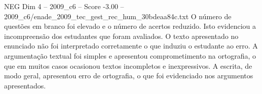 \begin{textsample}{NEG Dim 4 – 2009\_c6 – Score -3.00 – 2009\_c6/enade\_2009\_tec\_gest\_rec\_hum\_30bdeaa84c.txt}
O número de questões em branco foi elevado e o número de acertos reduzido.
Isto evidenciou a incompreensão dos estudantes que foram avaliados.
O texto apresentado no enunciado não foi interpretado corretamente o que induziu o estudante ao erro.
A argumentação textual foi simples e apresentou comprometimento na ortografia, o que em muitos casos ocasionou textos incompletos e inexpressivos.
A escrita, de modo geral, apresentou erro de ortografia, o que foi evidenciado nos argumentos apresentados.

\end{textsample}
